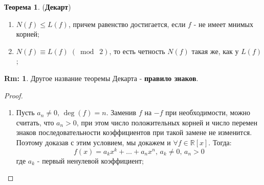 \documentclass[12pt]{article}
\newcommand{\MR}{\mathbb{R}}
\theoremstyle{definition}
\newtheorem{rem}{Rm:}
\newtheorem{theorem}{Теорема}
\newcommand{\modn}[3]{#1 \equiv #2 \; (\bmod \; #3)}
\begin{document}
\begin{theorem}(\textbf{Декарт})
	\begin{enumerate}[label=\arabic*)]
		\item $N(f) \leq L(f)$, причем равенство достигается, если $f$ - не имеет мнимых корней;
		\item $\modn{N(f)}{L(f)}{2}$, то есть четность $N(f)$ такая же, как у $L(f)$;
	\end{enumerate}
\end{theorem}
\begin{rem}
	Другое название теоремы Декарта - \textbf{правило знаков}.
\end{rem}
\begin{proof}\hfill
	\begin{enumerate}[label=(\arabic*)]
		\item Пусть $a_n \neq 0, \, \deg(f) = n$. Заменив $f$ на $-f$ при необходимости, можно считать, что $a_n > 0$, при этом число положительных корней и число перемен знаков последовательности коэффициентов при такой замене не изменится. Поэтому доказав с этим условием, мы докажем и $\forall f \in \MR[x]$. Тогда:
		$$
			f(x) = a_kx^k  + \dotsc + a_n x^n, \, a_k \neq 0, \, a_n > 0
		$$
		где $a_k$ - первый ненулевой коэффициент;
		

\end{enumerate}
\end{proof}
\end{document}
